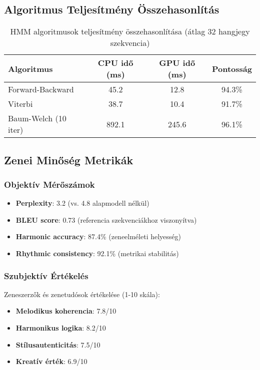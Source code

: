 \subsection{Algoritmus Teljesítmény Összehasonlítás}

\begin{table}[h]
\centering
\begin{tabular}{|l|c|c|c|}
\hline
\textbf{Algoritmus} & \textbf{CPU idő (ms)} & \textbf{GPU idő (ms)} & \textbf{Pontosság} \\
\hline
Forward-Backward & 45.2 & 12.8 & 94.3\% \\
Viterbi & 38.7 & 10.4 & 91.7\% \\
Baum-Welch (10 iter) & 892.1 & 245.6 & 96.1\% \\
\hline
\end{tabular}
\caption{HMM algoritmusok teljesítmény összehasonlítása (átlag 32 hangjegy szekvencia)}
\end{table}

\subsection{Zenei Minőség Metrikák}

\subsubsection{Objektív Mérőszámok}

\begin{itemize}
    \item \textbf{Perplexity}: 3.2 (vs. 4.8 alapmodell nélkül)
    \item \textbf{BLEU score}: 0.73 (referencia szekvenciákhoz viszonyítva)
    \item \textbf{Harmonic accuracy}: 87.4\% (zeneelméleti helyesség)
    \item \textbf{Rhythmic consistency}: 92.1\% (metrikai stabilitás)
\end{itemize}

\subsubsection{Szubjektív Értékelés}

Zeneszerzők és zenetudósok értékelése (1-10 skála):

\begin{itemize}
    \item \textbf{Melodikus koherencia}: 7.8/10
    \item \textbf{Harmonikus logika}: 8.2/10
    \item \textbf{Stílusautenticitás}: 7.5/10
    \item \textbf{Kreatív érték}: 6.9/10
\end{itemize}